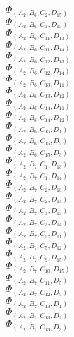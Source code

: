 \documentclass[14pt]{article}
\begin{document}
    $\Phi_{({A}_{2}, {B}_{6}, {C}_{2}, {D}_{15})}$ \\ 
    $\Phi_{({A}_{2}, {B}_{6}, {C}_{3}, {D}_{15})}$ \\ 
    $\Phi_{({A}_{2}, {B}_{6}, {C}_{11}, {D}_{13})}$ \\ 
    $\Phi_{({A}_{2}, {B}_{6}, {C}_{11}, {D}_{14})}$ \\ 
    $\Phi_{({A}_{2}, {B}_{6}, {C}_{12}, {D}_{13})}$ \\ 
    $\Phi_{({A}_{2}, {B}_{6}, {C}_{12}, {D}_{14})}$ \\ 
    $\Phi_{({A}_{2}, {B}_{6}, {C}_{13}, {D}_{11})}$ \\ 
    $\Phi_{({A}_{2}, {B}_{6}, {C}_{13}, {D}_{12})}$ \\ 
    $\Phi_{({A}_{2}, {B}_{6}, {C}_{14}, {D}_{11})}$ \\ 
    $\Phi_{({A}_{2}, {B}_{6}, {C}_{14}, {D}_{12})}$ \\ 
    $\Phi_{({A}_{2}, {B}_{6}, {C}_{15}, {D}_{1})}$ \\ 
    $\Phi_{({A}_{2}, {B}_{6}, {C}_{15}, {D}_{2})}$ \\ 
    $\Phi_{({A}_{2}, {B}_{6}, {C}_{15}, {D}_{3})}$ \\ 
    $\Phi_{({A}_{2}, {B}_{7}, {C}_{1}, {D}_{13})}$ \\ 
    $\Phi_{({A}_{2}, {B}_{7}, {C}_{1}, {D}_{14})}$ \\ 
    $\Phi_{({A}_{2}, {B}_{7}, {C}_{2}, {D}_{13})}$ \\ 
    $\Phi_{({A}_{2}, {B}_{7}, {C}_{2}, {D}_{14})}$ \\ 
    $\Phi_{({A}_{2}, {B}_{7}, {C}_{3}, {D}_{13})}$ \\ 
    $\Phi_{({A}_{2}, {B}_{7}, {C}_{3}, {D}_{14})}$ \\ 
    $\Phi_{({A}_{2}, {B}_{7}, {C}_{5}, {D}_{11})}$ \\ 
    $\Phi_{({A}_{2}, {B}_{7}, {C}_{5}, {D}_{12})}$ \\ 
    $\Phi_{({A}_{2}, {B}_{7}, {C}_{9}, {D}_{15})}$ \\ 
    $\Phi_{({A}_{2}, {B}_{7}, {C}_{10}, {D}_{15})}$ \\ 
    $\Phi_{({A}_{2}, {B}_{7}, {C}_{11}, {D}_{5})}$ \\ 
    $\Phi_{({A}_{2}, {B}_{7}, {C}_{12}, {D}_{5})}$ \\ 
    $\Phi_{({A}_{2}, {B}_{7}, {C}_{13}, {D}_{1})}$ \\ 
    $\Phi_{({A}_{2}, {B}_{7}, {C}_{13}, {D}_{2})}$ \\ 
    $\Phi_{({A}_{2}, {B}_{7}, {C}_{13}, {D}_{3})}$ \\ 
\end{document}
